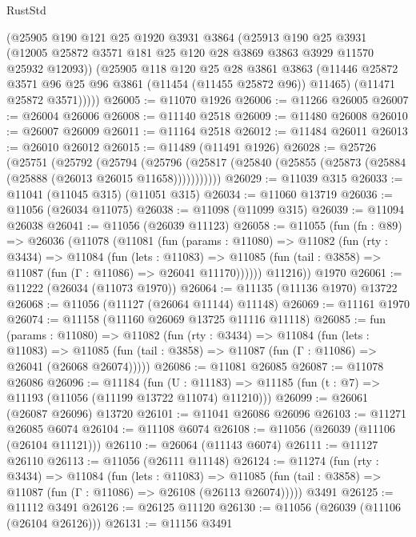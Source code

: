 \begin{lexlean}{RustStd}
\begin{coremodule}
        (@25905
          @190
          @121
          @25
          @1920
          @3931
          @3864
          (@25913
            @190
            @25
            @3931
            (@12005 @25872 @3571 @181 @25 @120 @28 @3869 @3863 @3929 @11570 @25932 @12093))
          (@25905
            @118
            @120
            @25
            @28
            @3861
            @3863
            (@11446 @25872 @3571 @96 @25 @96 @3861 (@11454 (@11455 @25872 @96)) @11465)
            (@11471 @25872 @3571)))))
@26005 := @11070 @1926
@26006 := @11266 @26005
@26007 := @26004 @26006
@26008 := @11140 @2518
@26009 := @11480 @26008
@26010 := @26007 @26009
@26011 := @11164 @2518
@26012 := @11484 @26011
@26013 := @26010 @26012
@26015 := @11489 (@11491 @1926)
@26028 := @25726
    (@25751
      (@25792
        (@25794
          (@25796 (@25817 (@25840 (@25855 (@25873 (@25884 (@25888 (@26013 @26015 @11658)))))))))))
@26029 := @11039 @315
@26033 := @11041 (@11045 @315) (@11051 @315)
@26034 := @11060 @13719
@26036 := @11056 (@26034 @11075)
@26038 := @11098 (@11099 @315)
@26039 := @11094 @26038
@26041 := @11056 (@26039 @11123)
@26058 := @11055
    (fun (fn : @89) =>
    @26036
      (@11078
        (@11081
          (fun (params : @11080) =>
          @11082
            (fun (rty : @3434) =>
            @11084
              (fun (lets : @11083) =>
              @11085 (fun (tail : @3858) => @11087 (fun (Γ : @11086) => @26041 @11170))))))
        @11216))
    @1970
@26061 := @11222 (@26034 (@11073 @1970))
@26064 := @11135 (@11136 @1970) @13722
@26068 := @11056 (@11127 (@26064 @11144) @11148)
@26069 := @11161 @1970
@26074 := @11158 (@11160 @26069 @13725 @11116 @11118)
@26085 := fun (params : @11080) =>
  @11082
    (fun (rty : @3434) =>
    @11084
      (fun (lets : @11083) =>
      @11085 (fun (tail : @3858) => @11087 (fun (Γ : @11086) => @26041 (@26068 @26074)))))
@26086 := @11081 @26085
@26087 := @11078 @26086
@26096 := @11184
    (fun (U : @11183) => @11185 (fun (t : @7) => @11193 (@11056 (@11199 @13722 @11074) @11210)))
@26099 := @26061 (@26087 @26096) @13720
@26101 := @11041 @26086 @26096
@26103 := @11271 @26085 @6074
@26104 := @11108 @6074
@26108 := @11056 (@26039 (@11106 (@26104 @11121)))
@26110 := @26064 (@11143 @6074)
@26111 := @11127 @26110
@26113 := @11056 (@26111 @11148)
@26124 := @11274
    (fun (rty : @3434) =>
    @11084
      (fun (lets : @11083) =>
      @11085 (fun (tail : @3858) => @11087 (fun (Γ : @11086) => @26108 (@26113 @26074)))))
    @3491
@26125 := @11112 @3491
@26126 := @26125 @11120
@26130 := @11056 (@26039 (@11106 (@26104 @26126)))
@26131 := @11156 @3491

\end{coremodule}
\end{lexlean}
